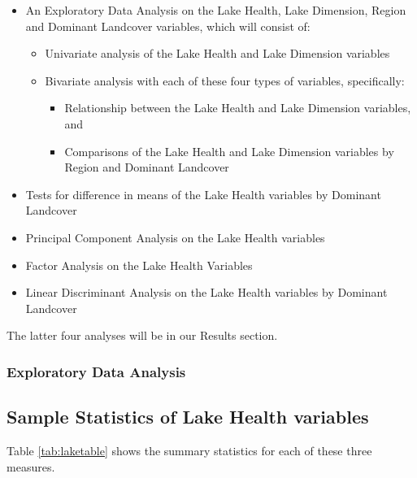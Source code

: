 \documentclass[
]{article}
\begin{document}
\begin{itemize}
\item
  An Exploratory Data Analysis on the Lake Health, Lake Dimension, Region and Dominant Landcover variables, which will consist of:

  \begin{itemize}
  \item
    Univariate analysis of the Lake Health and Lake Dimension variables
  \item
    Bivariate analysis with each of these four types of variables, specifically:

    \begin{itemize}
    \item
      Relationship between the Lake Health and Lake Dimension variables, and
    \item
      Comparisons of the Lake Health and Lake Dimension variables by Region and Dominant Landcover
    \end{itemize}
  \end{itemize}
\item
  Tests for difference in means of the Lake Health variables by Dominant Landcover
\item
  Principal Component Analysis on the Lake Health variables
\item
  Factor Analysis on the Lake Health Variables
\item
  Linear Discriminant Analysis on the Lake Health variables by Dominant Landcover
\end{itemize}

The latter four analyses will be in our Results section.

\hypertarget{exploratory-data-analysis}{%
\subsubsection{Exploratory Data Analysis}\label{exploratory-data-analysis}}

\hypertarget{sample-statistics-of-lake-health-variables}{%
\subsection{Sample Statistics of Lake Health variables}\label{sample-statistics-of-lake-health-variables}}

Table \ref{tab:laketable} shows the summary statistics for each of these three measures.
\end{document}
